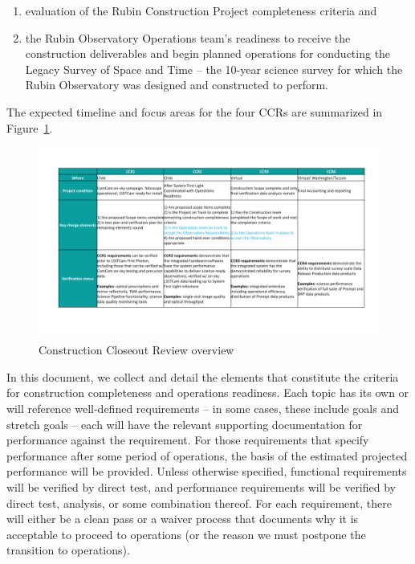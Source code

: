 \begin{enumerate}
        \item evaluation of the Rubin Construction Project completeness criteria and
        \item the Rubin Observatory Operations team's readiness to receive the construction deliverables and begin planned operations for conducting the Legacy Survey of Space and Time -- the 10-year science survey for which the Rubin Observatory was designed and constructed to perform.
\end{enumerate}

\noindent The expected timeline and focus areas for the four CCRs are summarized in Figure~\ref{CCRs_overview}.

\begin{figure}[htbp]
\begin{center}
\includegraphics[width=1\textwidth]{./CCRs_overview.png}
\caption{Construction Closeout Review overview}
\label{CCRs_overview}
\end{center}
\end{figure}

In this document, we collect and detail the elements that constitute the criteria for construction completeness and operations readiness.
Each topic has its own or will reference well-defined requirements -- in some cases, these include goals and stretch goals -- each will have the relevant supporting documentation for performance against the requirement.
For those requirements that specify performance after some period of operations, the basis of the estimated projected performance will be provided.
Unless otherwise specified, functional requirements will be verified by direct test, and performance requirements will be verified by direct test, analysis, or some combination thereof.
For each requirement, there will either be a clean pass or a waiver process that documents why it is acceptable to proceed to operations (or the reason we must postpone the transition to operations).

